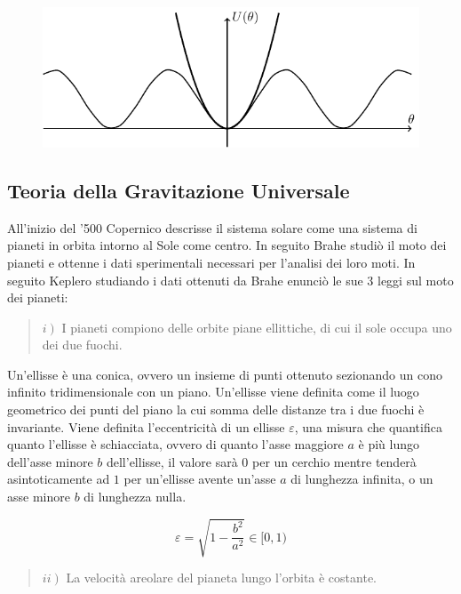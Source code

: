 \documentclass{article}
\numberwithin{equation}{subsection}
\begin{document}
\begin{figure}[H]%
    \centering
    \includegraphics{approssimazione-equilibrio.pdf}%
\end{figure}

\subsection{Teoria della Gravitazione Universale}

All'inizio del '500 Copernico descrisse il sistema solare come una sistema di pianeti in orbita intorno al Sole come centro. In seguito Brahe studiò 
il moto dei pianeti e ottenne i dati sperimentali necessari per l'analisi dei loro moti. In seguito Keplero studiando i dati ottenuti da Brahe 
enunciò le sue $3$ leggi sul moto dei pianeti:

\begin{quotation}
    $i\left.\right)$ I pianeti compiono delle orbite piane ellittiche, di cui il sole occupa uno dei due fuochi.
\end{quotation}

Un'ellisse è una conica, ovvero un insieme di punti ottenuto sezionando un cono infinito tridimensionale con un piano. Un'ellisse viene definita 
come il luogo geometrico dei punti del piano la cui somma delle distanze tra i due fuochi è invariante. Viene definita l'eccentricità 
di un ellisse $\varepsilon$, una misura che quantifica quanto l'ellisse è schiacciata, ovvero di quanto l'asse maggiore $a$ è più lungo dell'asse 
minore $b$ dell'ellisse, il valore sarà $0$ per un cerchio mentre tenderà asintoticamente ad $1$ per un'ellisse avente un'asse $a$ di lunghezza infinita, o un asse minore $b$ di lunghezza nulla. 

\begin{equation*}
    \varepsilon=\sqrt{1-\displaystyle\frac{b^2}{a^2}}\in[0,1)
\end{equation*}

\begin{quotation}
    $ii\left.\right)$ La velocità areolare del pianeta lungo l'orbita è costante. 
\end{quotation}
\end{document}
